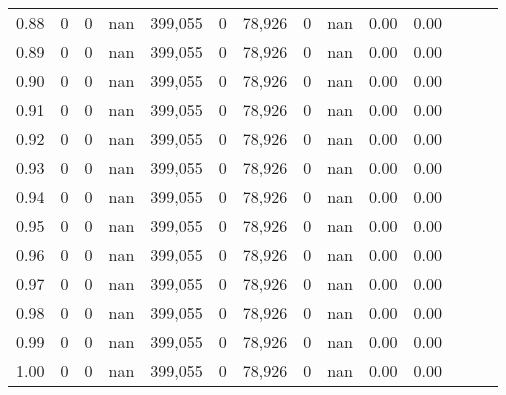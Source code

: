 \begin{tabular}{rrrrrrrrrrrrrr}
0.88 &       0 &       0 &   nan &  399,055 &        0 &  78,926 &       0 &   nan &  0.00 &      0.00 \\
0.89 &       0 &       0 &   nan &  399,055 &        0 &  78,926 &       0 &   nan &  0.00 &      0.00 \\
0.90 &       0 &       0 &   nan &  399,055 &        0 &  78,926 &       0 &   nan &  0.00 &      0.00 \\
0.91 &       0 &       0 &   nan &  399,055 &        0 &  78,926 &       0 &   nan &  0.00 &      0.00 \\
0.92 &       0 &       0 &   nan &  399,055 &        0 &  78,926 &       0 &   nan &  0.00 &      0.00 \\
0.93 &       0 &       0 &   nan &  399,055 &        0 &  78,926 &       0 &   nan &  0.00 &      0.00 \\
0.94 &       0 &       0 &   nan &  399,055 &        0 &  78,926 &       0 &   nan &  0.00 &      0.00 \\
0.95 &       0 &       0 &   nan &  399,055 &        0 &  78,926 &       0 &   nan &  0.00 &      0.00 \\
0.96 &       0 &       0 &   nan &  399,055 &        0 &  78,926 &       0 &   nan &  0.00 &      0.00 \\
0.97 &       0 &       0 &   nan &  399,055 &        0 &  78,926 &       0 &   nan &  0.00 &      0.00 \\
0.98 &       0 &       0 &   nan &  399,055 &        0 &  78,926 &       0 &   nan &  0.00 &      0.00 \\
0.99 &       0 &       0 &   nan &  399,055 &        0 &  78,926 &       0 &   nan &  0.00 &      0.00 \\
1.00 &       0 &       0 &   nan &  399,055 &        0 &  78,926 &       0 &   nan &  0.00 &      0.00 \\
\bottomrule
\end{tabular}
